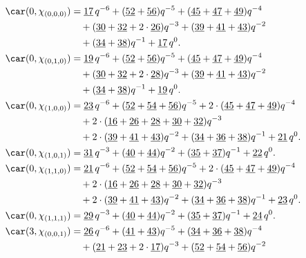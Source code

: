 \begin{align*}
	\car(0,\chi_{(0,0,0)})
	&=\underline{17}\,q^{-6}+(\underline{52}+\underline{56})q^{-5}+(\underline{45}+\underline{47}+\underline{49})q^{-4}\\
	&\quad+(\underline{30}+\underline{32}+2\cdot\underline{26})q^{-3}+(\underline{39}+\underline{41}+\underline{43})q^{-2}\\
	&\quad+(\underline{34}+\underline{38})q^{-1}+\underline{17}\,q^0.\\
	\car(0,\chi_{(0,1,0)})
	&=\underline{19}\,q^{-6}+(\underline{52}+\underline{56})q^{-5}+(\underline{45}+\underline{47}+\underline{49})q^{-4}\\
	&\quad+(\underline{30}+\underline{32}+2\cdot\underline{28})q^{-3}+(\underline{39}+\underline{41}+\underline{43})q^{-2}\\
	&\quad+(\underline{34}+\underline{38})q^{-1}+\underline{19}\,q^0.\\
	\car(0,\chi_{(1,0,0)})
	&=\underline{23}\,q^{-6}+(\underline{52}+\underline{54}+\underline{56})q^{-5}+2\cdot(\underline{45}+\underline{47}+\underline{49})q^{-4}\\
	&\quad+2\cdot(\underline{16}+\underline{26}+\underline{28}+\underline{30}+\underline{32})q^{-3}\\
	&\quad+2\cdot(\underline{39}+\underline{41}+\underline{43})q^{-2}+(\underline{34}+\underline{36}+\underline{38})q^{-1}+\underline{21}\,q^0.\\
	\car(0,\chi_{(1,0,1)})
	&=\underline{31}\,q^{-3}+(\underline{40}+\underline{44})q^{-2}+(\underline{35}+\underline{37})q^{-1}+\underline{22}\,q^0.\\
	\car(0,\chi_{(1,1,0)})
	&=\underline{21}\,q^{-6}+(\underline{52}+\underline{54}+\underline{56})q^{-5}+2\cdot(\underline{45}+\underline{47}+\underline{49})q^{-4}\\
	&\quad+2\cdot(\underline{16}+\underline{26}+\underline{28}+\underline{30}+\underline{32})q^{-3}\\
	&\quad+2\cdot(\underline{39}+\underline{41}+\underline{43})q^{-2}+(\underline{34}+\underline{36}+\underline{38})q^{-1}+\underline{23}\,q^0.\\
	\car(0,\chi_{(1,1,1)})
	&=\underline{29}\,q^{-3}+(\underline{40}+\underline{44})q^{-2}+(\underline{35}+\underline{37})q^{-1}+\underline{24}\,q^0.\\
	\car(3,\chi_{(0,0,1)})
	&=\underline{26}\,q^{-6}+(\underline{41}+\underline{43})q^{-5}+(\underline{34}+\underline{36}+\underline{38})q^{-4}\\
	&\quad+(\underline{21}+\underline{23}+2\cdot\underline{17})q^{-3}+(\underline{52}+\underline{54}+\underline{56})q^{-2}\\

\end{align*}

